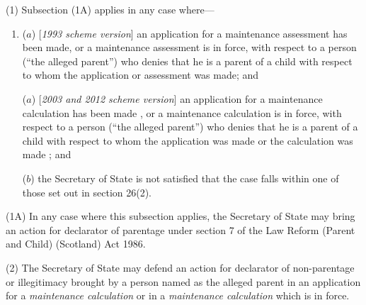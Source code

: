 \documentclass[12pt,a4paper]{article}
\begin{document}
(1) Subsection (1A) applies in any case where—
\begin{enumerate}\item[]
($a$) [\emph{1993 scheme version}] an application for a maintenance assessment has been made, or a maintenance assessment is in force, with respect to a person (“the alleged parent”) who denies that he is a parent of a child with respect to whom the application or assessment was made; and

($a$) [\emph{2003 and 2012 scheme version}] an application for a 
maintenance calculation  %
has been made%
, or a 
maintenance calculation  %
is in force, with respect to a person (“the alleged parent”) who denies that he is a parent of a child with respect to whom the application 
was made 
or the calculation was made%
; and

($b$) 
the 
Secretary of State  %
is not satisfied that the case falls within one of those set out in section 26(2).
\end{enumerate}

(1A) In any case where this subsection applies, the 
Secretary of State  %
may bring an action for declarator of parentage under section 7 of the Law Reform (Parent and Child) (Scotland) Act 1986.

(2) The 
Secretary of State  %
may defend an action for declarator of non-parentage or illegitimacy brought by a person named as the alleged parent in an application for a 
\emph{maintenance calculation}  %
or in a 
\emph{maintenance calculation}  %
which is in force.  %
\end{document}

